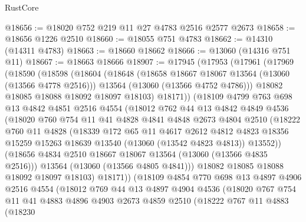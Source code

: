 \begin{lexlean}{RustCore}
\begin{coremodule}
@18656 := @18020 @752 @219 @11 @27 @4783 @2516 @2577 @2673
@18658 := @18656 @1226 @2510
@18660 := @18055 @751 @4783
@18662 := @14310 (@14311 @4783)
@18663 := @18660 @18662
@18666 := @13060 (@14316 @751 @11)
@18667 := @18663 @18666
@18907 := @17945
    (@17953
      (@17961
        (@17969
          (@18590
            (@18598
              (@18604
                (@18648
                  (@18658 @18667 @18067 @13564 (@13060 (@13566 @4778 @2516)))
                  @13564
                  (@13060 (@13566 @4752 @4786)))
                @18082
                @18085
                @18088
                @18092
                @18097
                @18103)
              @18171))
          (@18109
            @4799
            @763
            @698
            @13
            @4842
            @4851
            @2516
            @4554
            (@18012
              @762
              @44
              @13
              @4842
              @4849
              @4536
              (@18020
                @760
                @754
                @11
                @41
                @4828
                @4841
                @4848
                @2673
                @4804
                @2510
                (@18222
                  @760
                  @11
                  @4828
                  (@18339
                    @172
                    @65
                    @11
                    @4617
                    @2612
                    @4812
                    @4823
                    @18356
                    @15259
                    @15263
                    @18639
                    @13540
                    (@13060 (@13542 @4823 @4813))
                    @13552))
                (@18656 @4834 @2510 @18667 @18067 @13564 (@13060 (@13566 @4835 @2516)))
                @13564
                (@13060 (@13566 @4805 @4841)))
              @18082
              @18085
              @18088
              @18092
              @18097
              @18103)
            @18171))
        (@18109
          @4854
          @770
          @698
          @13
          @4897
          @4906
          @2516
          @4554
          (@18012
            @769
            @44
            @13
            @4897
            @4904
            @4536
            (@18020
              @767
              @754
              @11
              @41
              @4883
              @4896
              @4903
              @2673
              @4859
              @2510
              (@18222
                @767
                @11
                @4883
                (@18230

\end{coremodule}
\end{lexlean}
